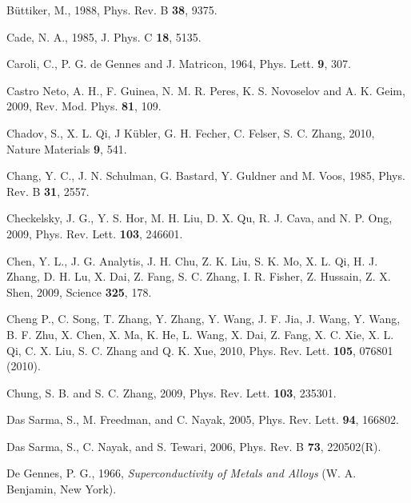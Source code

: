 \documentclass[twocolumn,floatfix,showpacs,rmp,aps]{revtex4}
\begin{document}
\begin{thebibliography}{99}
B\"uttiker, M., 1988,
Phys. Rev. B {\bf 38}, 9375.

Cade, N. A., 1985,
J. Phys. C {\bf 18}, 5135.

Caroli, C., P. G. de Gennes and J. Matricon, 1964,
Phys. Lett. {\bf 9}, 307.

Castro Neto, A. H., F. Guinea, N. M. R. Peres, K. S. Novoselov and A. K. Geim, 2009,
Rev. Mod. Phys. {\bf 81}, 109.

Chadov, S., X. L. Qi, J K\"ubler, G. H. Fecher, C. Felser, S. C. Zhang, 2010,
Nature Materials {\bf 9}, 541.

Chang, Y. C., J. N. Schulman, G. Bastard, Y. Guldner and M. Voos, 1985,
Phys. Rev. B {\bf 31}, 2557.


Checkelsky, J. G., Y. S. Hor, M. H. Liu, D. X. Qu, R. J. Cava, and N. P. Ong, 2009,
Phys. Rev. Lett. {\bf 103}, 246601.

Chen, Y. L., J. G. Analytis, J. H. Chu, Z. K. Liu, S. K. Mo, X. L. Qi, H. J. Zhang,
D. H. Lu, X. Dai, Z. Fang, S. C. Zhang, I. R. Fisher, Z. Hussain, Z. X. Shen, 2009,
Science {\bf 325}, 178.

Cheng P., C. Song, T. Zhang, Y. Zhang, Y. Wang, J. F. Jia, J. Wang, Y. Wang, B. F. Zhu,
X. Chen, X. Ma, K. He, L. Wang, X. Dai, Z. Fang, X. C. Xie, X. L. Qi, C. X. Liu,
S. C. Zhang and Q. K. Xue, 2010,
Phys. Rev. Lett. {\bf 105}, 076801 (2010).

Chung, S. B. and S. C. Zhang, 2009,
Phys. Rev. Lett. {\bf 103}, 235301.

Das Sarma, S., M. Freedman, and C. Nayak, 2005,
Phys. Rev. Lett. {\bf 94}, 166802.

Das Sarma, S., C. Nayak, and S. Tewari, 2006,
Phys. Rev. B {\bf 73}, 220502(R).

De Gennes, P. G., 1966,
{\it Superconductivity of Metals and Alloys} (W. A. Benjamin, New York).


\end{thebibliography}
\end{document}
